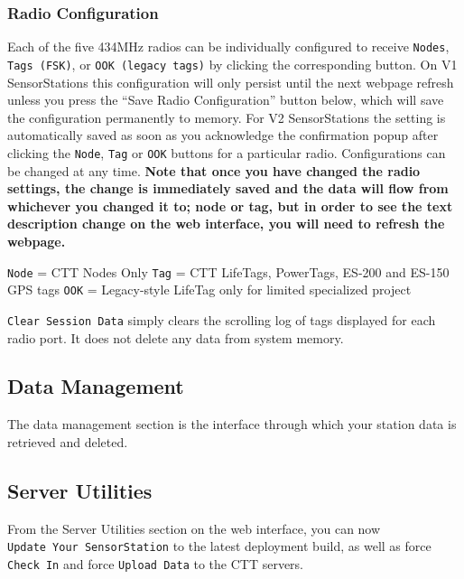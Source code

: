 \documentclass[
]{article}
\begin{document}
\hypertarget{radio-configuration}{%
\subsubsection{Radio Configuration}\label{radio-configuration}}

Each of the five 434MHz radios can be individually configured to receive
\texttt{Nodes}, \texttt{Tags\ (FSK)}, or \texttt{OOK\ (legacy\ tags)} by
clicking the corresponding button. On V1 SensorStations this
configuration will only persist until the next webpage refresh unless
you press the ``Save Radio Configuration'' button below, which will save
the configuration permanently to memory. For V2 SensorStations the
setting is automatically saved as soon as you acknowledge the
confirmation popup after clicking the \texttt{Node}, \texttt{Tag} or
\texttt{OOK} buttons for a particular radio. Configurations can be
changed at any time. \textbf{Note that once you have changed the radio
settings, the change is immediately saved and the data will flow from
whichever you changed it to; node or tag, but in order to see the text
description change on the web interface, you will need to refresh the
webpage.}

\texttt{Node} = CTT Nodes Only \texttt{Tag} = CTT LifeTags, PowerTags,
ES-200 and ES-150 GPS tags \texttt{OOK} = Legacy-style LifeTag only for
limited specialized project

\texttt{Clear\ Session\ Data} simply clears the scrolling log of tags
displayed for each radio port. It does not delete any data from system
memory.

\hypertarget{data-management}{%
\subsection{Data Management}\label{data-management}}

The data management section is the interface through which your station
data is retrieved and deleted.

\hypertarget{server-utilities}{%
\subsection{Server Utilities}\label{server-utilities}}

From the Server Utilities section on the web interface, you can now
\texttt{Update\ Your\ SensorStation} to the latest deployment build, as
well as force \texttt{Check\ In} and force \texttt{Upload\ Data} to the
CTT servers.
\end{document}
